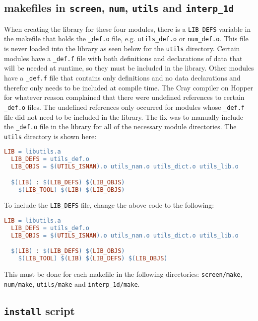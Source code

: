 \subsection{makefiles in {\tt screen}, {\tt num}, {\tt utils} and 
{\tt interp\_1d}}

When creating the library for these four modules, there is a {\tt LIB\_DEFS} 
variable in the makefile that holds the {\tt *\_def.o} file, e.g. 
{\tt utils\_def.o} or {\tt num\_def.o}. This file is never loaded into the 
library as seen below for the {\tt utils} directory. Certain modules have a 
{\tt *\_def.f} file with both definitions and declarations of data that will 
be needed at runtime, so they must be included in the library. Other modules 
have a {\tt *\_def.f} file that contains only definitions and no data 
declarations and therefor only needs to be included at compile time. The Cray 
compiler on Hopper for whatever reason complained that there were undefined 
references to certain {\tt *\_def.o} files. The undefined references only 
occurred for modules whose {\tt *\_def.f} file did not need to be included in 
the library. The fix was to manually include the {\tt *\_def.o} file in the 
library for all of the necessary module directories. The {\tt utils} directory 
is shown here:
\begin{lstlisting}[language=make,mathescape=false]
  LIB = libutils.a
  LIB_DEFS = utils_def.o
  LIB_OBJS = $(UTILS_ISNAN).o utils_nan.o utils_dict.o utils_lib.o

  $(LIB) : $(LIB_DEFS) $(LIB_OBJS)
  	$(LIB_TOOL) $(LIB) $(LIB_OBJS)
\end{lstlisting}
To include the {\tt LIB\_DEFS} file, change the above code to the following:
\begin{lstlisting}[language=make,mathescape=false]
  LIB = libutils.a
  LIB_DEFS = utils_def.o
  LIB_OBJS = $(UTILS_ISNAN).o utils_nan.o utils_dict.o utils_lib.o

  $(LIB) : $(LIB_DEFS) $(LIB_OBJS)
  	$(LIB_TOOL) $(LIB) $(LIB_DEFS) $(LIB_OBJS)
\end{lstlisting}
This must be done for each makefile in the following directories: 
{\tt screen/make}, {\tt num/make}, {\tt utils/make} and {\tt interp\_1d/make}.

\subsection{{\tt install} script}

